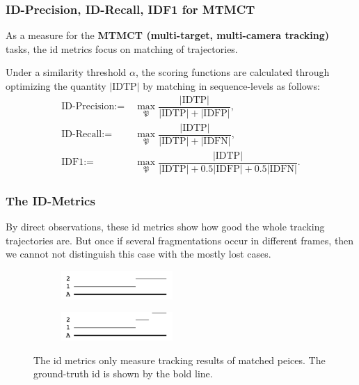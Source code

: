 \documentclass[slidetop, mathserif]{beamer}
\begin{document}
\begin{frame}
	\frametitle{ID-Precision, ID-Recall, IDF1 for MTMCT}
	
	As a measure for the {\bf MTMCT (multi-target, multi-camera tracking)} tasks,
	the id metrics focus on matching of trajectories.
	
	\quad 
	
	Under a similarity threshold $\alpha$, the scoring functions are calculated through optimizing
	the quantity $|\text{IDTP}|$ by matching in sequence-levels as follows:
	\begin{align*}
		\text{ID-Precision} := & ~ \max_{\mathfrak P} \dfrac{|\text{IDTP}|}{|\text{IDTP}| + |\text{IDFP}|}, \\
		\text{ID-Recall} :=    & ~ \max_{\mathfrak P}\dfrac{|\text{IDTP}|}{|\text{IDTP}| + |\text{IDFN}|},  \\
		\text{IDF1} :=         &                                                                            
		~ \max_{\mathfrak P}\dfrac{|\text{IDTP}|}{|\text{IDTP}| + 0.5|\text{IDFP}| + 0.5|\text{IDFN}|}.
	\end{align*}
	
\end{frame}

\begin{frame}
	\frametitle{The ID-Metrics}
	
	By direct observations, these id metrics show how good the whole tracking trajectories are.
	But once if several fragmentations occur in different frames,
	then we cannot not distinguish this case with the mostly lost cases.
	
	\begin{figure}
		\begin{subfigure}{.5\textwidth}
			\centering
			\includegraphics[width=120pt]{pics/fig6.png}
		\end{subfigure}%
		\begin{subfigure}{.5\textwidth}
			\centering
			\includegraphics[width=120pt]{pics/fig7.png}
		\end{subfigure}
		\caption{The id metrics only measure tracking results of matched peices.
		The ground-truth id is shown by the bold line.}
	\end{figure}
	
\end{frame}
\end{document}
